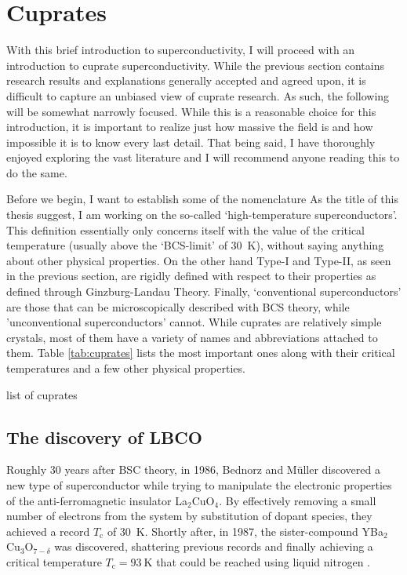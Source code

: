 \section{Cuprates}\label{sec:cuprates}
With this brief introduction to superconductivity, I will proceed with an introduction to cuprate superconductivity. While the previous section contains research results and explanations generally accepted and agreed upon, it is difficult to capture an unbiased view of cuprate research. As such, the following will be somewhat narrowly focused. While this is a reasonable choice for this introduction, it is important to realize just how massive the field is and how impossible it is to know every last detail. That being said, I have thoroughly enjoyed exploring the vast literature and I will recommend anyone reading this to do the same.

Before we begin, I want to establish some of the nomenclature  As the title of this thesis suggest, I am working on the so-called `high-temperature superconductors'. This definition essentially only concerns itself with the value of the critical temperature (usually above the `BCS-limit' of \SI{30}{\kelvin}), without saying anything about other physical properties. On the other hand Type-I and Type-II, as seen in the previous section, are rigidly defined with respect to their properties as defined through Ginzburg-Landau Theory. Finally, `conventional superconductors' are those that can be microscopically described with BCS theory, while 'unconventional superconductors' cannot. While cuprates are relatively simple crystals, most of them have a variety of names and abbreviations attached to them. Table \ref{tab:cuprates} lists the most important ones along with their critical temperatures and a few other physical properties.

\begin{table}
    \caption[table of cuprates]{list of cuprates}
    \label{tab:cuprates}
\end{table}

\subsection{The discovery of LBCO}
Roughly 30 years after BSC theory, in 1986, Bednorz and M\"uller discovered a new type of superconductor while trying to manipulate the electronic properties of the anti-ferromagnetic insulator La$_2$CuO$_4$. By effectively removing a small number of electrons from the system by substitution of dopant species, they achieved a record $T_\text{c}$ of \SI{30}{\kelvin}. Shortly after, in 1987, the sister-compound YBa$_2$Cu$_3$O$_{7-\delta}$ was discovered, shattering previous records and finally achieving a critical temperature $T_\text{c} = \SI{93}{\kelvin}$ that could be reached using liquid nitrogen \cite{Wu1987}.

